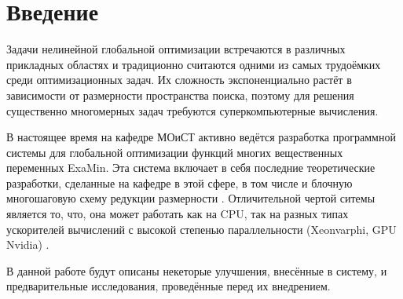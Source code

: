 \section{Введение}
Задачи нелинейной глобальной оптимизации встречаются в различных прикладных областях и традиционно считаются одними из самых трудоёмких среди оптимизационных задач.
Их сложность экспоненциально растёт в зависимости от размерности пространства поиска, поэтому для решения существенно многомерных задач требуются
суперкомпьютерные вычисления.
\par
В настоящее время на кафедре МОиСТ активно ведётся разработка программной системы для глобальной оптимизации функций многих вещественных переменных ExaMin.
Эта система включает в себя последние теоретические разработки, сделанные на кафедре в этой сфере, в том числе и блочную многошаговую схему редукции размерности \cite{blockNested}.
Отличительной чертой ситемы является то, что, она может работать как на CPU, так на разных типах ускорителей вычислений с высокой степенью параллельности (Xeonvarphi, GPU Nvidia) \cite{examinArtcle, examinphiArtcle}.
\par
В данной работе будут описаны некеторые улучшения, внесённые в систему, и предварительные исследования, проведённые перед их внедрением.
